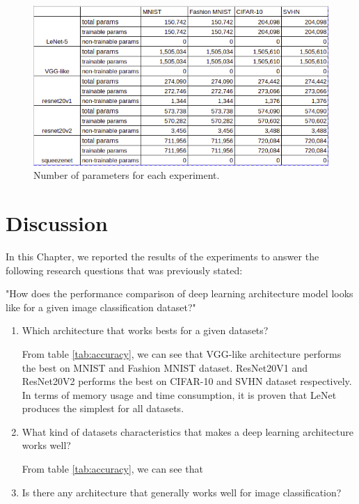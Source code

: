 \begin{figure}[h]
	\includegraphics[scale=0.5]{figures/params}
	\centering
	\caption{Number of parameters for each experiment.}
	\label{fig:params}
\end{figure}

\section{Discussion}
In this Chapter, we reported the results of the experiments to answer the following research questions that was previously stated:

"How does the performance comparison of deep learning architecture model looks like for a given image classification dataset?"

\begin{enumerate}
	\item Which architecture that works bests for a given datasets?
	
	From table \ref{tab:accuracy}, we can see that VGG-like architecture performs the best on MNIST and Fashion MNIST dataset. ResNet20V1 and ResNet20V2 performs the best on CIFAR-10 and SVHN dataset respectively. In terms of memory usage and time consumption, it is proven that LeNet produces the simplest for all datasets.
	
	
	\item What kind of datasets characteristics that makes a deep learning architecture works well?
	
	From table \ref{tab:accuracy}, we can see that 
	\item Is there any architecture that generally works well for image classification?	
\end{enumerate}


 